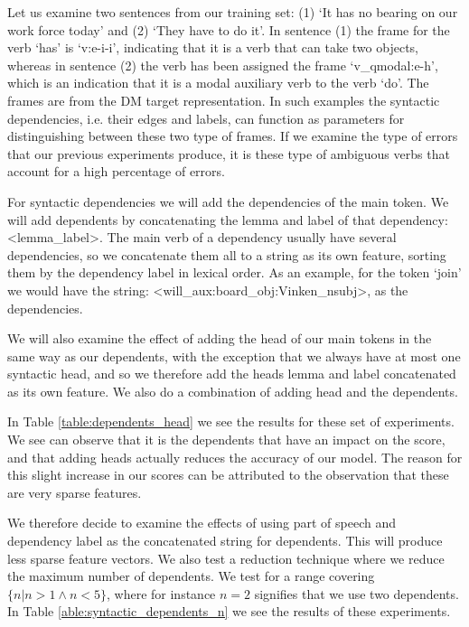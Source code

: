 Let us examine two sentences from our training set: (1) `It has no bearing on our work force today' and (2) `They have to do it'. In sentence (1) the frame for the verb `has' is `v:e-i-i', indicating that it is a verb that can take two objects, whereas in sentence (2) the verb has been assigned the frame `v\_qmodal:e-h', which is an indication that it is a modal auxiliary verb to the verb `do'. The frames are from the DM target representation. In such examples the syntactic dependencies, i.e. their edges and labels, can function as parameters for distinguishing between these two type of frames. If we examine the type of errors that our previous experiments produce, it is these type of ambiguous verbs that account for a high percentage of errors.

For syntactic dependencies we will add the dependencies of the main token. We will add dependents by concatenating the lemma and label of that dependency: <lemma\_label>. The main verb of a dependency usually have several dependencies, so we concatenate them all to a string as its own feature, sorting them by the dependency label in lexical order. As an example, for the token `join' we would have the string: <will\_aux:board\_obj:Vinken\_nsubj>, as the dependencies.

We will also examine the effect of adding the head of our main tokens in the same way as our dependents, with the exception that we always have at most one syntactic head, and so we therefore add the heads lemma and label concatenated as its own feature. We also do a combination of adding head and the dependents.

In Table \ref{table:dependents_head} we see the results for these set of experiments. We see can observe that it is the dependents that have an impact on the score, and that adding heads actually reduces the accuracy of our model. The reason for this slight increase in our scores can be attributed to the observation that these are very sparse features. 

We therefore decide to examine the effects of using part of speech and dependency label as the concatenated string for dependents. This will produce less sparse feature vectors. We also test a reduction technique where we reduce the maximum number of dependents. We test for a range covering ${\{n|n>1 \wedge n<5\}}$, where for instance $n=2$ signifies that we use two dependents. In Table \ref{able:syntactic_dependents_n} we see the results of these experiments.

